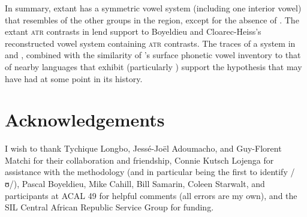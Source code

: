 \documentclass[output=paper,colorlinks,citecolor=brown]{langscibook}
\begin{document}
In summary, extant  has a symmetric  vowel system  (including one interior vowel) that resembles  of the other groups in the region, except for the absence of . The extant \textsc{atr} contrasts in  lend support to Boyeldieu and Cloarec-Heiss’s reconstructed  vowel system  containing \textsc{atr} contrasts. The traces of a  system in  and , combined with the similarity of ’s surface phonetic vowel inventory to that of nearby languages that exhibit  (particularly ) support the hypothesis that  may have had  at some point in its history.

\section*{Acknowledgements}

I wish to thank Tychique Longbo, Jessé-Joël Adoumacho, and Guy-Florent Matchi for their collaboration and friendship, Connie Kutsch Lojenga for assistance with the methodology (and in particular being the first to identify /ʊ/), Pascal Boyeldieu, Mike Cahill, Bill Samarin, Coleen Starwalt, and participants at ACAL 49 for helpful comments (all errors are my own), and the SIL Central African Republic Service Group for funding.

{\sloppy\printbibliography[heading=subbibliography,notkeyword=this]}
\end{document}
